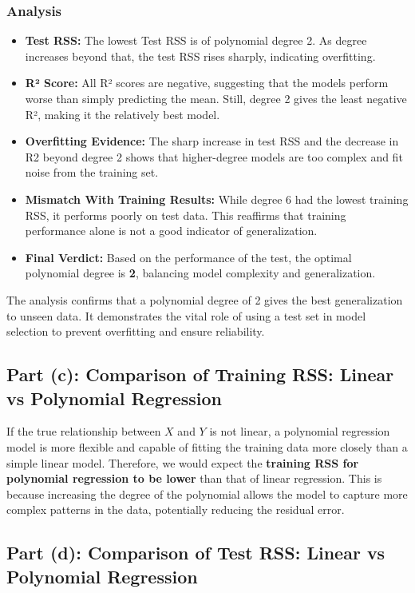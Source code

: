 \documentclass[12pt]{article}
\begin{document}
\subsubsection*{Analysis}
\begin{itemize}
    \item \textbf{Test RSS:} The lowest Test RSS is of polynomial degree 2. As degree increases beyond that, the test RSS rises sharply, indicating overfitting.
    \item \textbf{R² Score:} All R² scores are negative, suggesting that the models perform worse than simply predicting the mean. Still, degree 2 gives the least negative R², making it the relatively best model.
    \item \textbf{Overfitting Evidence:} The sharp increase in test RSS and the decrease in R2 beyond degree 2 shows that higher-degree models are too complex and fit noise from the training set.
    \item \textbf{Mismatch With Training Results:} While degree 6 had the lowest training RSS, it performs poorly on test data. This reaffirms that training performance alone is not a good indicator of generalization.
    \item \textbf{Final Verdict:} Based on the performance of the test, the optimal polynomial degree is \textbf{2}, balancing model complexity and generalization.
\end{itemize}

The analysis confirms that a polynomial degree of 2 gives the best generalization to unseen data. It demonstrates the vital role of using a test set in model selection to prevent overfitting and ensure reliability.

\subsection*{Part (c): Comparison of Training RSS: Linear vs Polynomial Regression}

If the true relationship between $X$ and $Y$ is not linear, a polynomial regression model is more flexible and capable of fitting the training data more closely than a simple linear model. Therefore, we would expect the \textbf{training RSS for polynomial regression to be lower} than that of linear regression. This is because increasing the degree of the polynomial allows the model to capture more complex patterns in the data, potentially reducing the residual error.

\subsection*{Part (d): Comparison of Test RSS: Linear vs Polynomial Regression}
\end{document}
